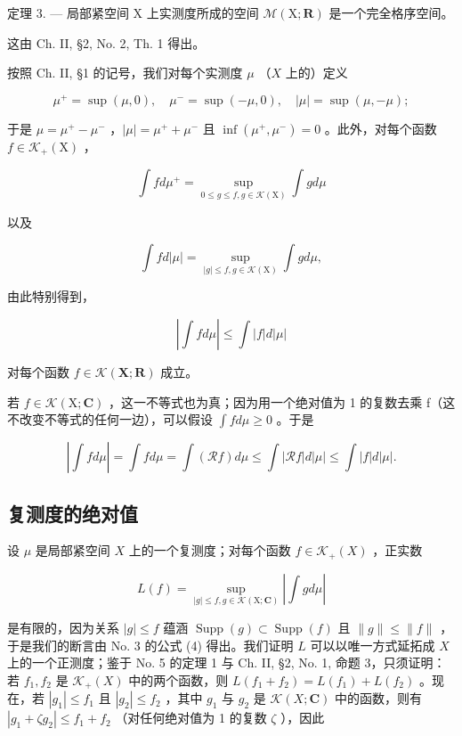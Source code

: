 定理 3. --- 局部紧空间 X 上实测度所成的空间 \(\mathcal{M}(\mathrm{X};\mathbf{R})\) 是一个完全格序空间。

这由 Ch. II, §2, No. 2, Th. 1 得出。

按照 Ch. II, §1 的记号，我们对每个实测度 \(\mu\) （\(X\) 上的）定义

\[
\mu^ {+} = \sup (\mu , 0), \quad \mu^ {-} = \sup (- \mu , 0), \quad | \mu | = \sup (\mu , - \mu);
\]

于是 \(\mu = \mu^{+} - \mu^{-}\) ，\(|\mu| = \mu^{+} + \mu^{-}\) 且 \(\inf (\mu^{+},\mu^{-}) = 0\) 。此外，对每个函数 \(f\in \mathcal{K}_{+}(\mathrm{X})\) ，

\[
\int f d \mu^ {+} = \sup _ {0 \leqslant g \leqslant f, g \in \mathcal {K} (\mathrm{X})} \int g d \mu\tag{8}
\]

以及

\[
\int f d | \mu | = \sup _ {| g | \leqslant f, g \in \mathcal {K} (\mathrm{X})} \int g d \mu ,\tag{9}
\]

由此特别得到，

\[
\left| \int f d \mu \right| \leqslant \int | f | d | \mu |\tag{10}
\]

对每个函数 \(f \in \mathcal{K}(\mathbf{X};\mathbf{R})\) 成立。

若 \(f \in \mathcal{K}(\mathrm{X};\mathbf{C})\) ，这一不等式也为真；因为用一个绝对值为 1 的复数去乘 f（这不改变不等式的任何一边），可以假设 \(\int f d\mu \geqslant 0\) 。于是

\[
\left| \int f d \mu \right| = \int f d \mu = \int (\mathcal {R} f) d \mu \leqslant \int | \mathcal {R} f | d | \mu | \leqslant \int | f | d | \mu |.
\]

\subsection{复测度的绝对值}

设 \(\mu\) 是局部紧空间 \(X\) 上的一个复测度；对每个函数 \(f \in \mathcal{K}_{+}(X)\) ，正实数

\[
L (f) = \sup _ {| g | \leqslant f, g \in \mathcal {K} (\mathrm{X}; \mathbf {C})} \left| \int g d \mu \right|\tag{11}
\]

是有限的，因为关系 \(|g| \leqslant f\) 蕴涵 \(\operatorname{Supp}(g) \subset \operatorname{Supp}(f)\) 且 \(\| g \| \leqslant \| f \|\) ，于是我们的断言由 No. 3 的公式 (4) 得出。我们证明 \(L\) 可以以唯一方式延拓成 \(X\) 上的一个正测度；鉴于 No. 5 的定理 1 与 Ch. II, §2, No. 1, 命题 3，只须证明：若 \(f_1, f_2\) 是 \(\mathcal{K}_+(X)\) 中的两个函数，则 \(L(f_1 + f_2) = L(f_1) + L(f_2)\) 。现在，若 \(|g_1| \leqslant f_1\) 且 \(|g_2| \leqslant f_2\) ，其中 \(g_1\) 与 \(g_2\) 是 \(\mathcal{K}(X; \mathbf{C})\) 中的函数，则有 \(|g_1 + \zeta g_2| \leqslant f_1 + f_2\) （对任何绝对值为 1 的复数 \(\zeta\) ），因此

